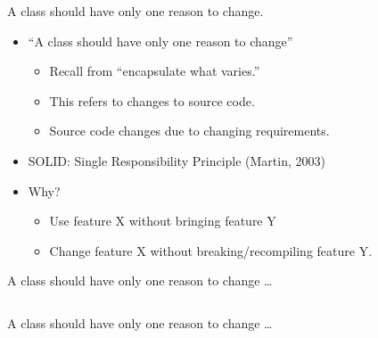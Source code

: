 \documentclass{beamer}
\begin{document}
\begin{frame}{A class should have only one reason to change.}
    \begin{itemize}
        \item ``A class should have only one reason to change''
        \begin{itemize}
            \item Recall from ``encapsulate what varies.''
            \item This refers to changes to source code.
            \item Source code changes due to changing requirements.
        \end{itemize}
    \item SOLID: Single Responsibility Principle (Martin, 2003)
    \item Why? 
        \begin{itemize}
            \item Use feature X without bringing feature Y
            \item Change feature X without breaking/recompiling feature Y.
        \end{itemize}
    \end{itemize}
\end{frame}

\begin{frame}{A class should have only one reason to change \ldots}
    \vspace{0cm}
    \begin{columns}
        \column{\dimexpr\paperwidth-40pt}
        
    \end{columns}
\end{frame}

\begin{frame}{A class should have only one reason to change \ldots}
    \vspace{0cm}
    \begin{columns}
        \column{\dimexpr\paperwidth-40pt}
        
    \end{columns}
\end{frame}
\end{document}

